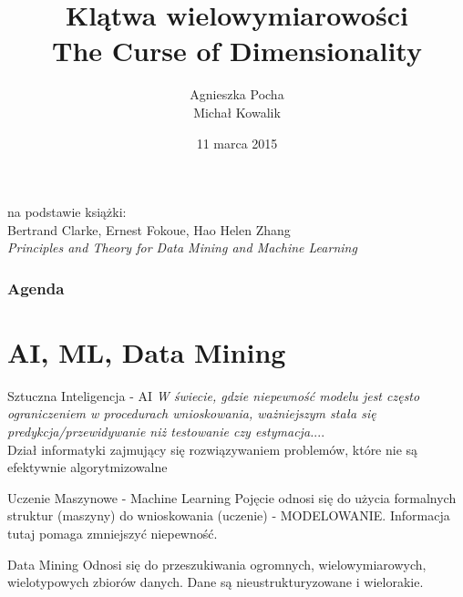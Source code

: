 \documentclass[a4paper]{beamer}
\author{Agnieszka Pocha \\ Michał Kowalik}
\title{Klątwa wielowymiarowości \\ The Curse of Dimensionality}
\date{11 marca 2015}
\begin{document}
\begin{frame}
\titlepage
{\footnotesize
na podstawie książki: \\
Bertrand Clarke, Ernest Fokoue, Hao Helen Zhang \\
}
\textit{Principles and Theory for Data Mining and Machine Learning}
\end{frame}


\begin{frame}
\frametitle{Agenda}
\tableofcontents
\end{frame}

\section{AI, ML, Data Mining}
\begin{frame}
\begin{block}{Sztuczna Inteligencja - AI}
\textit{W świecie, gdzie niepewność modelu jest często ograniczeniem w procedurach wnioskowania, ważniejszym stała się predykcja/przewidywanie niż testowanie czy estymacja.}... \\
Dział informatyki zajmujący się rozwiązywaniem problemów, które nie są efektywnie algorytmizowalne
\end{block}

\begin{block}{Uczenie Maszynowe - Machine Learning}
Pojęcie odnosi się do użycia formalnych struktur (maszyny) do wnioskowania (uczenie) - MODELOWANIE. Informacja tutaj pomaga zmniejszyć niepewność.
\end{block}

\begin{block}{Data Mining}
Odnosi się do przeszukiwania ogromnych, wielowymiarowych, wielotypowych zbiorów danych. Dane są nieustrukturyzowane i wielorakie.
\end{block}
\end{frame}
\end{document}
